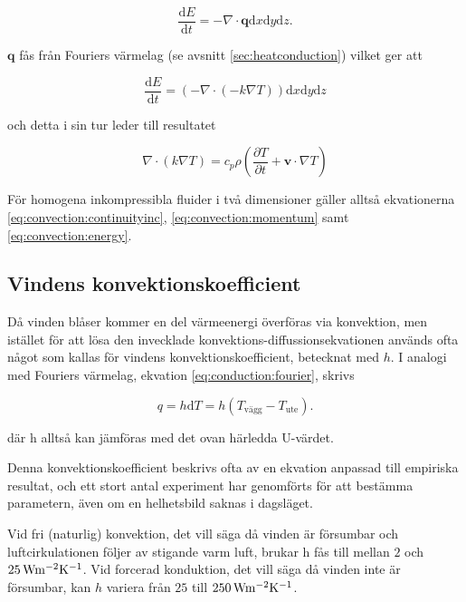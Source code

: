 \begin{equation}
\frac{\mathrm{d}E}{\mathrm{d}t} = - \nabla \cdot \mathbf{q} \mathrm{d}x\mathrm{d}y\mathrm{d}z.
\end{equation}

$\mathbf{q}$ fås från Fouriers värmelag (se avsnitt \ref{sec:heatconduction}) vilket ger att

\begin{equation}
\label{reynoldsenergytwo}
\frac{\mathrm{d}E}{\mathrm{d}t} = \left( - \nabla \cdot \left( -k \nabla T \right) \right)\mathrm{d}x\mathrm{d}y\mathrm{d}z
\end{equation}

och detta i sin tur leder till resultatet

\begin{equation}
\label{eq:convection:energy}\boxed{ \; \; \;
\nabla \cdot \left( k \nabla T \right) = c_p \rho \left( \frac{\partial T}{\partial t} + \mathbf{v}\cdot \nabla T\right)
\; \; \;}
\end{equation}

För homogena inkompressibla fluider i två dimensioner gäller alltså ekvationerna
\eqref{eq:convection:continuityinc}, \eqref{eq:convection:momentum} samt \eqref{eq:convection:energy}.

\subsection{Vindens konvektionskoefficient}
\label{subsec:windconv}

Då vinden blåser kommer en del värmeenergi överföras via konvektion, men istället för att lösa den invecklade konvektions-diffussionsekvationen används ofta något som kallas för vindens konvektionskoefficient, betecknat med $h$. I analogi med Fouriers värmelag, ekvation \ref{eq:conduction:fourier}, skrivs

\begin{equation}\boxed{ \; \; \;
q = h\mathrm{d}T = h\left( T_\text{vägg} - T_\text{ute}\right).
\; \; \;}\end{equation}

där h alltså kan jämföras med det ovan härledda U-värdet. 

Denna konvektionskoefficient beskrivs ofta av en ekvation anpassad till empiriska resultat, och ett stort antal experiment har genomförts för att bestämma parametern, även om en helhetsbild saknas i dagsläget.

Vid fri (naturlig) konvektion, det vill säga då vinden är försumbar och luftcirkulationen
följer av stigande varm luft, brukar h fås till mellan $2$ och $\unit[25]{Wm^{-2}K^{-1}}$.
Vid forcerad konduktion, det vill säga då vinden inte är försumbar,
kan $h$ variera från $25$ till $\unit[250]{Wm^{-2}K^{-1}}$. \cite{ASHRAE09}

